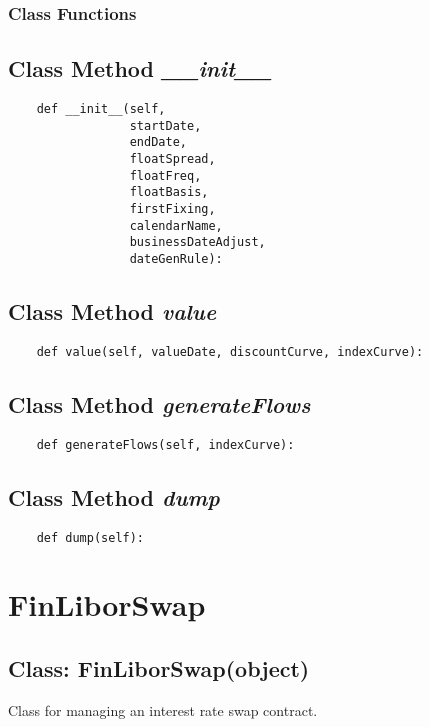 \documentclass[twoside,11pt]{book}
\begin{document}
\subsubsection{Class Functions}

\subsection{Class Method {\it \_\_init\_\_}}


\begin{lstlisting}
    def __init__(self,
                 startDate,
                 endDate,
                 floatSpread,
                 floatFreq,
                 floatBasis,
                 firstFixing,
                 calendarName,
                 businessDateAdjust,
                 dateGenRule):
\end{lstlisting}

\subsection{Class Method {\it value}}


\begin{lstlisting}
    def value(self, valueDate, discountCurve, indexCurve):
\end{lstlisting}

\subsection{Class Method {\it generateFlows}}


\begin{lstlisting}
    def generateFlows(self, indexCurve):
\end{lstlisting}

\subsection{Class Method {\it dump}}


\begin{lstlisting}
    def dump(self):
\end{lstlisting}

\newpage
\section{FinLiborSwap}

\subsection{Class: FinLiborSwap(object)}
Class for managing an interest rate swap contract. 
\end{document}
